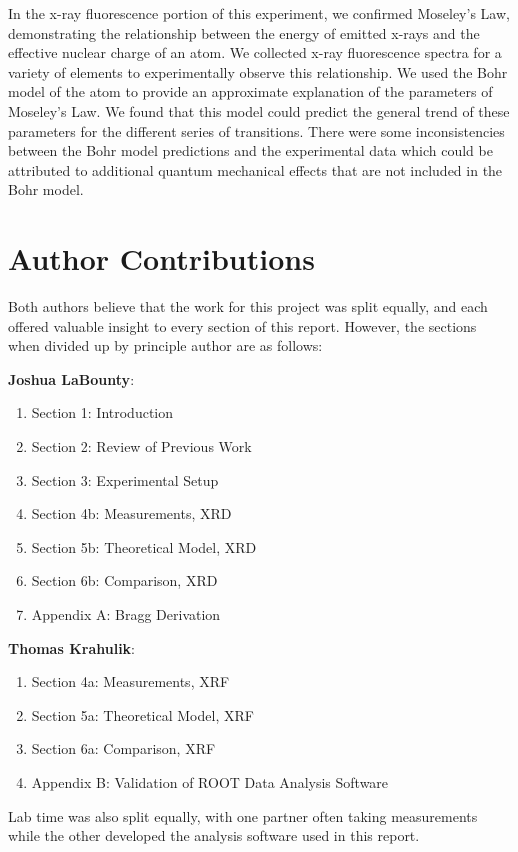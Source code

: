 \documentclass[%
 reprint,
 amsmath,amssymb,
 aps,
 pra,
]{revtex4-1}
\begin{document}
In the x-ray fluorescence portion of this experiment, we confirmed Moseley's Law, demonstrating the relationship between the energy of emitted x-rays and the effective nuclear charge of an atom. We collected x-ray fluorescence spectra for a variety of elements to experimentally observe this relationship. We used the Bohr model of the atom to provide an approximate explanation of the parameters of Moseley's Law. We found that this model could predict the general trend of these parameters for the different series of transitions. There were some inconsistencies between the Bohr model predictions and the experimental data which could be attributed to additional quantum mechanical effects that are not included in the Bohr model. 

\section{Author Contributions}

Both authors believe that the work for this project was split equally, and each offered valuable insight to every section of this report. However, the sections when divided up by principle author are as follows:

\noindent \textbf{Joshua LaBounty}:
\begin{enumerate}
	\item Section 1: Introduction
	\item Section 2: Review of Previous Work
	\item Section 3: Experimental Setup
	\item Section 4b: Measurements, XRD
	\item Section 5b: Theoretical Model, XRD
	\item Section 6b: Comparison, XRD
	\item Appendix A: Bragg Derivation
\end{enumerate}

\noindent \textbf{Thomas Krahulik}:
\begin{enumerate}
	\item Section 4a: Measurements, XRF
	\item Section 5a: Theoretical Model, XRF
	\item Section 6a: Comparison, XRF
	\item Appendix B: Validation of ROOT Data Analysis Software
\end{enumerate}

\noindent Lab time was also split equally, with one partner often taking measurements while the other developed the analysis software used in this report.
\end{document}
